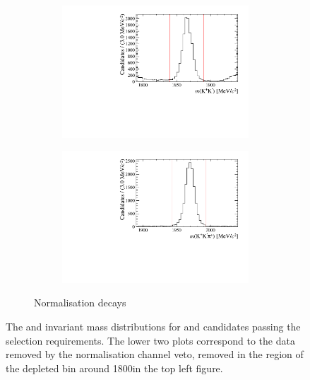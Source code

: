 \begin{figure}[!h]
   \begin{subfigure}[t]{1.0\textwidth}
      \centering
      \begin{subfigure}[t]{0.40\textwidth}
         \centering
         \includegraphics[width=1.0\textwidth]{figs/Selection/Phimass_KKPi_B2DsD0.pdf}
      \end{subfigure}
      \begin{subfigure}[t]{0.40\textwidth}
         \centering
         \includegraphics[width=1.0\textwidth]{figs/Selection/Dmass_KKPi_B2DsD0.pdf}
      \end{subfigure}
      \caption{Normalisation \decay{\Bp}{\Dsp\Dzb} decays}
   \end{subfigure}
   \caption{The \Dsp and \Kp\Km invariant mass distributions for \decay{\Bp}{\Dsp\Kp\Km} and \decay{\Bp}{\Dsp\Dzb} candidates passing the selection requirements. The lower two plots correspond to the data removed by the normalisation channel veto, removed in the region of the depleted bin around 1800\mevcc in the top left figure.}
   \label{fig:d_KK_mass}   
\end{figure}

